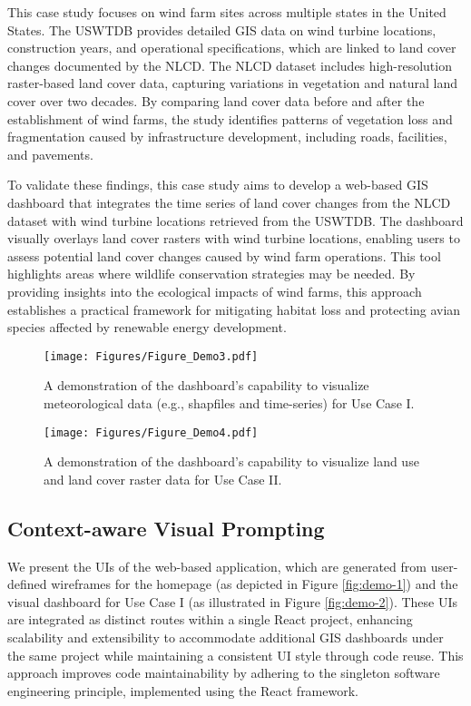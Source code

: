 This case study focuses on wind farm sites across multiple states in the United States. The USWTDB provides detailed GIS data on wind turbine locations, construction years, and operational specifications, which are linked to land cover changes documented by the NLCD. The NLCD dataset includes high-resolution raster-based land cover data, capturing variations in vegetation and natural land cover over two decades. By comparing land cover data before and after the establishment of wind farms, the study identifies patterns of vegetation loss and fragmentation caused by infrastructure development, including roads, facilities, and pavements.

To validate these findings, this case study aims to develop a web-based GIS dashboard that integrates the time series of land cover changes from the NLCD dataset with wind turbine locations retrieved from the USWTDB. The dashboard visually overlays land cover rasters with wind turbine locations, enabling users to assess potential land cover changes caused by wind farm operations. This tool highlights areas where wildlife conservation strategies may be needed. By providing insights into the ecological impacts of wind farms, this approach establishes a practical framework for mitigating habitat loss and protecting avian species affected by renewable energy development.

\begin{figure*}[htbp]
 \centering
\texttt{[image: Figures/Figure\_Demo3.pdf]}
 \caption{A demonstration of the dashboard's capability to visualize meteorological data (e.g., shapfiles and time-series) for Use Case I. }
 \label{fig:demo-3}
\end{figure*}

\begin{figure*}[htbp]
 \centering
\texttt{[image: Figures/Figure\_Demo4.pdf]}
 \caption{A demonstration of the dashboard's capability to visualize land use and land cover raster data for Use Case II.}
 \label{fig:demo-4}
\end{figure*}

\subsection{Context-aware Visual Prompting}
We present the UIs of the web-based application, which are generated from user-defined wireframes for the homepage (as depicted in Figure \ref{fig:demo-1}) and the visual dashboard for Use Case I (as illustrated in Figure \ref{fig:demo-2}). These UIs are integrated as distinct routes within a single React project, enhancing scalability and extensibility to accommodate additional GIS dashboards under the same project while maintaining a consistent UI style through code reuse. This approach improves code maintainability by adhering to the singleton software engineering principle, implemented using the React framework.

